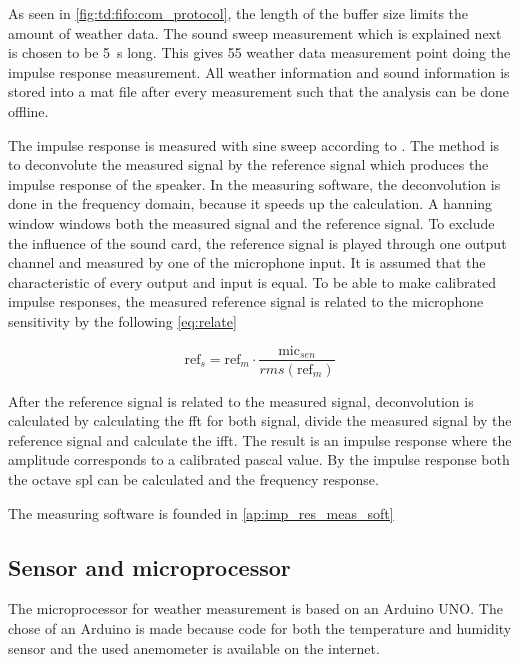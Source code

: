 As seen in \autoref{fig:td:fifo:com_protocol}, the length of the buffer size limits the amount of weather data. The sound sweep measurement which is explained next is chosen to be \SI{5}{\second} long. This gives 55 weather data measurement point doing the impulse response measurement. All weather information and sound information is stored into a mat file after every measurement such that the analysis can be done offline.

The impulse response is measured with sine sweep according to \citep{mller2001transfer}. The method is to deconvolute the measured signal by the reference signal which produces the impulse response of the speaker. In the measuring software, the deconvolution is done in the frequency domain, because it speeds up the calculation. A hanning window windows both the measured signal and the reference signal. To exclude the influence of the sound card, the reference signal is played through one output channel and measured by one of the microphone input. It is assumed that the characteristic of every output and input is equal. To be able to make calibrated impulse responses, the measured reference signal is related to the microphone sensitivity by the following \autoref{eq:relate}

\begin{equation}\label{eq:relate}
\text{ref}_{s} = \text{ref}_{m} \cdot    \frac{\text{mic}_{sen}}{rms(\text{ref}_{m})}
\end{equation}

\startexplain
{}
\stopexplain

After the reference signal is related to the measured signal, deconvolution is calculated by calculating the \gls{fft} for both signal, divide the measured signal by the reference signal and calculate the \gls{ifft}. The result is an impulse response where the amplitude corresponds to a calibrated pascal value. By the impulse response both the octave \gls{spl} can be calculated and the frequency response. 



The measuring software is founded in  \autoref{ap:imp_res_meas_soft}


\subsection{Sensor and microprocessor}\label{des:sensor_mic}
The microprocessor for weather measurement is based on an Arduino UNO. The chose of an Arduino is made because code for both the temperature and humidity sensor and the used anemometer is available on the internet.  

